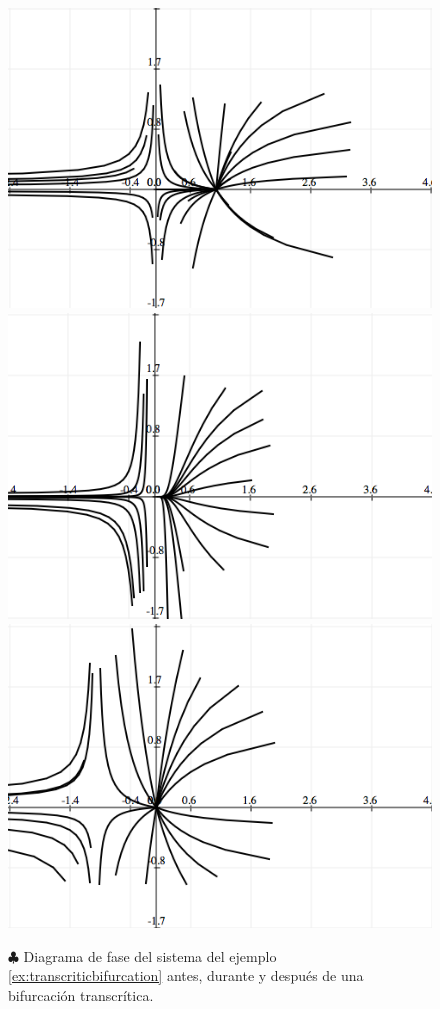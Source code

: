\begin{example}
\begin{figure}[!ht] \centering
\includegraphics[scale=0.45]{figures/transcriticbifurcation-before.png}
\includegraphics[scale=0.45]{figures/transcriticbifurcation-during.png} \\
\includegraphics[scale=0.45]{figures/transcriticbifurcation-after.png}
\caption{$\clubsuit$ Diagrama de fase del sistema del ejemplo \ref{ex:transcriticbifurcation} antes, durante y después de una bifurcación transcrítica.}
\end{figure}
\end{example}

